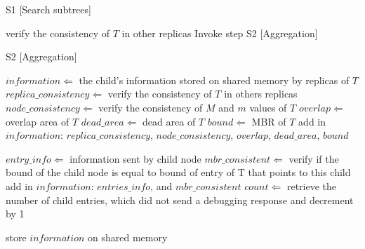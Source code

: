 \medskip
\begin{center}
\begin{minipage}{1\textwidth}
\begin{algorithm2e}[H]
\SetAlFnt{\small\sf}
 \DontPrintSemicolon
 \LinesNumbered
\SetAlgoLined
 \BlankLine
 \BlankLine

 S1 [Search subtrees]

{
  verify the consistency of $T$ in other replicas\;
      Invoke step S2 [Aggregation]\;
}

S2 [Aggregation]

$information \Leftarrow$ the child's information stored on shared memory by replicas of $T$\;
$replica\_consistency \Leftarrow$ verify the consistency of $T$ in others replicas\;
$node\_consistency \Leftarrow$	verify the consistency of $M$ and $m$ values of  $T$\;
$overlap \Leftarrow$ overlap area of $T$\;
$dead\_area \Leftarrow$ dead area of $T$\;
$bound \Leftarrow$ MBR of $T$\;
add in $information$: $replica\_consistency$, $node\_consistency$, $overlap$, $dead\_area$, $bound$\;

{
$entry\_info \Leftarrow$ information sent by child node\;
$mbr\_consistent \Leftarrow$ verify if the bound of the child node is equal to bound of entry of T that points to this child\;
add in $information$: $entries\_info$, and $mbr\_consistent$\;
$count \Leftarrow$ retrieve the number of child entries, which did not send a debugging response and decrement by 1\;

{
store $information$ on shared memory\;
}
          
}
\caption{$RDebug(T)$ 
\label {alg:rdebug}}
\end{algorithm2e}
\end{minipage}
\end{center}

